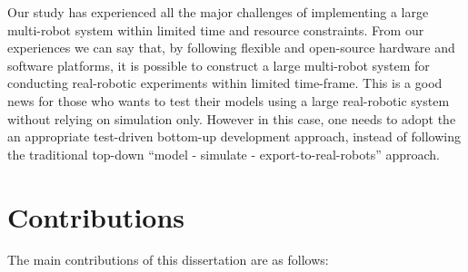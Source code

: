Our study has experienced all the major challenges of implementing a large multi-robot system within limited time and resource constraints. From our experiences we can say that, by following flexible and open-source hardware and software platforms, it is possible to construct a large multi-robot system for conducting real-robotic experiments within limited time-frame. This is a good news for those who wants to test their models using a large real-robotic system without relying on simulation only. However in this case, one needs to adopt the an appropriate test-driven bottom-up development approach, instead of following the traditional top-down ``model - simulate -  export-to-real-robots'' approach. 
\section{Contributions}
The main contributions of this dissertation are as follows:
